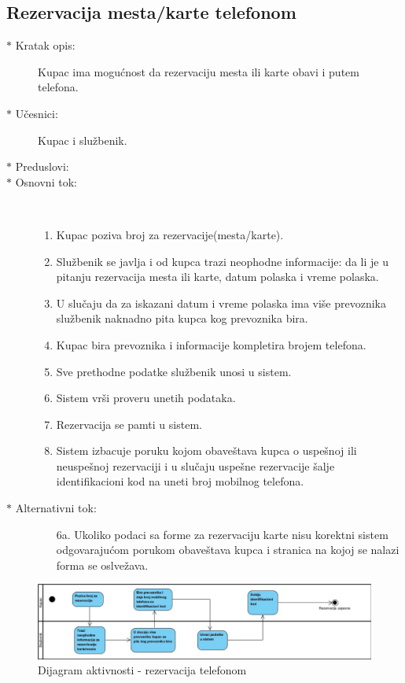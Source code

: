 \subsection{Rezervacija mesta/karte telefonom}
\begin{description}
	\item [$\ast$ Kratak opis: ] Kupac ima mogu\' cnost da rezervaciju mesta ili karte obavi i putem telefona.
	\item[$\ast$ U\v cesnici: ] Kupac i slu\v zbenik.
	\item[$\ast$ Preduslovi: ]
	\item[$\ast$ Osnovni tok: ] \ \\
	\renewcommand{\labelenumii}{\Roman{enumii}}
	\begin{enumerate}
		\item Kupac poziva broj za rezervacije(mesta/karte).
		\item Slu\v zbenik se javlja i od kupca trazi neophodne informacije: da li je u pitanju rezervacija mesta ili karte, datum polaska i vreme polaska.
		\item U slu\v caju da za iskazani datum i vreme polaska ima vi\v se prevoznika slu\v zbenik naknadno pita kupca kog prevoznika bira.
		\item Kupac bira prevoznika i informacije kompletira brojem telefona.
		\item Sve prethodne podatke slu\v zbenik unosi u sistem.
		\item Sistem vr\v si proveru unetih podataka.
		\item Rezervacija se pamti u sistem.
		\item Sistem izbacuje poruku kojom obave\v stava kupca o uspe\v snoj ili neuspe\v snoj rezervaciji i u slu\v caju uspe\v sne rezervacije \v salje identifikacioni kod na uneti broj mobilnog telefona.		
	\end{enumerate}
	\item[$\ast$ Alternativni tok: ]
	\begin{enumerate}
		\item[6a. ] Ukoliko podaci sa forme za rezervaciju karte nisu korektni sistem odgovaraju\' com porukom obave\v stava kupca i stranica na kojoj se nalazi forma se oslve\v zava.
	\end{enumerate}
\end{description}
\begin{figure}
	\centering
	\includegraphics[width=0.7\linewidth]{../Slike/rezervacijaTelefonom}
	\caption{Dijagram aktivnosti - rezervacija telefonom}
	\label{fig:rezervacijatelefonom}
\end{figure}	
\newpage
